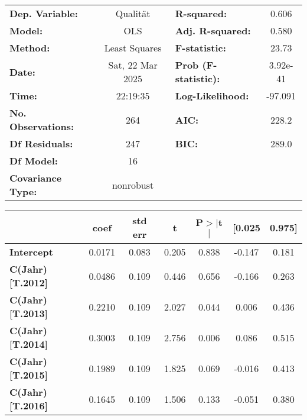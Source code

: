 \begin{center}
\begin{tabular}{lclc}
\toprule
\textbf{Dep. Variable:}    &     Qualität     & \textbf{  R-squared:         } &     0.606   \\
\textbf{Model:}            &       OLS        & \textbf{  Adj. R-squared:    } &     0.580   \\
\textbf{Method:}           &  Least Squares   & \textbf{  F-statistic:       } &     23.73   \\
\textbf{Date:}             & Sat, 22 Mar 2025 & \textbf{  Prob (F-statistic):} &  3.92e-41   \\
\textbf{Time:}             &     22:19:35     & \textbf{  Log-Likelihood:    } &   -97.091   \\
\textbf{No. Observations:} &         264      & \textbf{  AIC:               } &     228.2   \\
\textbf{Df Residuals:}     &         247      & \textbf{  BIC:               } &     289.0   \\
\textbf{Df Model:}         &          16      & \textbf{                     } &             \\
\textbf{Covariance Type:}  &    nonrobust     & \textbf{                     } &             \\
\bottomrule
\end{tabular}
\begin{tabular}{lcccccc}
                           & \textbf{coef} & \textbf{std err} & \textbf{t} & \textbf{P$> |$t$|$} & \textbf{[0.025} & \textbf{0.975]}  \\
\midrule
\textbf{Intercept}         &       0.0171  &        0.083     &     0.205  &         0.838        &       -0.147    &        0.181     \\
\textbf{C(Jahr)[T.2012]}   &       0.0486  &        0.109     &     0.446  &         0.656        &       -0.166    &        0.263     \\
\textbf{C(Jahr)[T.2013]}   &       0.2210  &        0.109     &     2.027  &         0.044        &        0.006    &        0.436     \\
\textbf{C(Jahr)[T.2014]}   &       0.3003  &        0.109     &     2.756  &         0.006        &        0.086    &        0.515     \\
\textbf{C(Jahr)[T.2015]}   &       0.1989  &        0.109     &     1.825  &         0.069        &       -0.016    &        0.413     \\
\textbf{C(Jahr)[T.2016]}   &       0.1645  &        0.109     &     1.506  &         0.133        &       -0.051    &        0.380     \\

\end{tabular}
\end{center}

